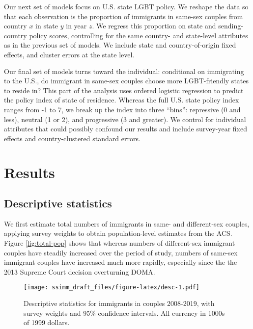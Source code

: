 \documentclass[
  11pt,
]{article}
\begin{document}
Our next set of models focus on U.S. state LGBT policy. We reshape the data so that each observation is the proportion of immigrants in same-sex couples from country \(x\) in state \(y\) in year \(z\). We regress this proportion on state and sending-country policy scores, controlling for the same country- and state-level attributes as in the previous set of models. We include state and country-of-origin fixed effects, and cluster errors at the state level.

Our final set of models turns toward the individual: conditional on immigrating to the U.S., do immigrant in same-sex couples choose more LGBT-friendly states to reside in? This part of the analysis uses ordered logistic regression to predict the policy index of state of residence. Whereas the full U.S. state policy index ranges from -1 to 7, we break up the index into three ``bins'': repressive (0 and less), neutral (1 or 2), and progressive (3 and greater). We control for individual attributes that could possibly confound our results and include survey-year fixed effects and country-clustered standard errors.

\hypertarget{results}{%
\section{Results}\label{results}}

\hypertarget{descriptive-statistics}{%
\subsection{Descriptive statistics}\label{descriptive-statistics}}

We first estimate total numbers of immigrants in same- and different-sex couples, applying survey weights to obtain population-level estimates from the ACS. Figure \ref{fig:total-pop} shows that whereas numbers of different-sex immigrant couples have steadily increased over the period of study, numbers of same-sex immigrant couples have increased much more rapidly, especially since the the 2013 Supreme Court decision overturning DOMA.

\begin{figure}
\centering
\texttt{[image: ssimm\_draft\_files/figure-latex/desc-1.pdf]}
\caption{\label{fig:desc}Descriptive statistics for immigrants in couples 2008-2019, with survey weights and 95\% confidence intervals. All currency in 1000s of 1999 dollars.}
\end{figure}
\end{document}
